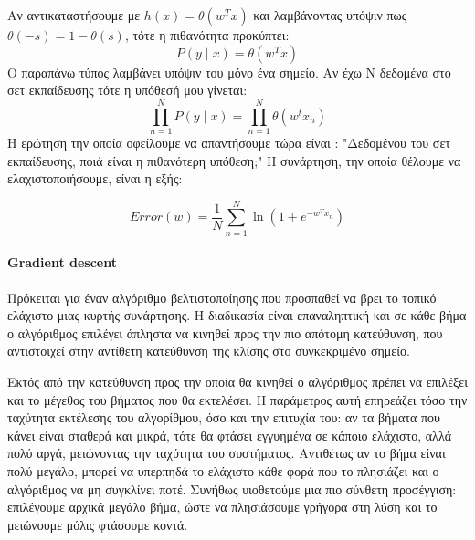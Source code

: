 Αν αντικαταστήσουμε με $h(x)=\theta(w^T x)$ και λαμβάνοντας υπόψιν πως $\theta(-s)= 1 - \theta(s)$, τότε η πιθανότητα  προκύπτει:
\begin{equation}
P(y \mid x)= \theta(w^T x)
\end{equation}
Ο παραπάνω τύπος λαμβάνει υπόψιν του μόνο ένα σημείο. Αν έχω N δεδομένα στο σετ εκπαίδευσης τότε η υπόθεσή μου γίνεται:
\begin{equation}
\prod_{n=1}^{N} P(y \mid x)= \prod_{n=1}^{N} \theta (w^t x_n)
\end{equation}
Η ερώτηση την οποία οφείλουμε να απαντήσουμε τώρα είναι : "Δεδομένου του σετ εκπαίδευσης, ποιά είναι η πιθανότερη υπόθεση;" Η συνάρτηση, την οποία θέλουμε να ελαχιστοποιήσουμε, είναι η εξής:

\begin{equation}
Error(w)= \frac{1}{N} \sum_{n=1}^{N} \ln (1 + e^{- w^T x_n} )
\end{equation}

\paragraph{Gradient descent} Πρόκειται για έναν αλγόριθμο βελτιστοποίησης που προσπαθεί να βρει το τοπικό ελάχιστο μιας κυρτής συνάρτησης. Η διαδικασία είναι επαναληπτική και σε κάθε βήμα ο αλγόριθμος επιλέγει άπληστα να κινηθεί προς την πιο απότομη κατεύθυνση, που αντιστοιχεί στην αντίθετη κατεύθυνση της κλίσης στο συγκεκριμένο σημείο.

Εκτός από την κατεύθυνση προς την οποία θα κινηθεί ο αλγόριθμος πρέπει να επιλέξει και το μέγεθος του βήματος που θα εκτελέσει. Η παράμετρος αυτή επηρεάζει τόσο την ταχύτητα εκτέλεσης του αλγορίθμου, όσο και την επιτυχία του: αν τα βήματα που κάνει είναι σταθερά και μικρά, τότε θα φτάσει εγγυημένα σε κάποιο ελάχιστο, αλλά πολύ αργά, μειώνοντας την ταχύτητα του συστήματος. Αντιθέτως αν το βήμα είναι πολύ μεγάλο, μπορεί να υπερπηδά το ελάχιστο κάθε φορά που το πλησιάζει και ο αλγόριθμος να μη συγκλίνει ποτέ. Συνήθως υιοθετούμε μια πιο σύνθετη προσέγγιση: επιλέγουμε αρχικά μεγάλο βήμα, ώστε να πλησιάσουμε γρήγορα στη λύση και το μειώνουμε μόλις φτάσουμε κοντά.
